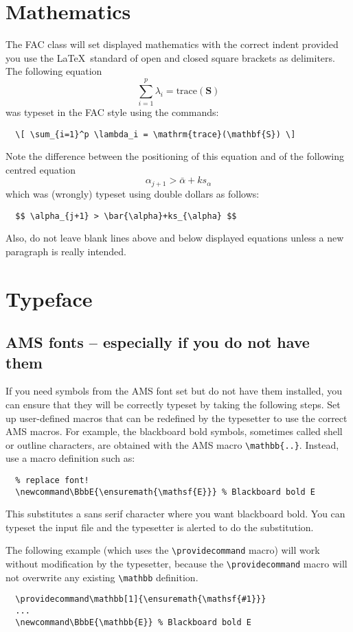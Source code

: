\documentclass{fac}
\begin{document}
\section{Mathematics}

The FAC class will set displayed mathematics with the correct indent
provided you use the \LaTeX\ standard of open and closed square brackets
as delimiters. The following equation
  \[ \sum_{i=1}^p \lambda_i = \mathrm{trace}(\mathbf{S}) \]
was typeset in the FAC style using the commands:
\begin{verbatim}
  \[ \sum_{i=1}^p \lambda_i = \mathrm{trace}(\mathbf{S}) \]
\end{verbatim}
Note the difference between the positioning of this equation and of
the following centred equation
  $$ \alpha_{j+1} > \bar{\alpha}+ks_{\alpha} $$
which was (wrongly) typeset using double dollars as follows:
\begin{verbatim}
  $$ \alpha_{j+1} > \bar{\alpha}+ks_{\alpha} $$
\end{verbatim}
Also, do not leave blank lines above and below displayed equations
unless a new paragraph is really intended.

\section{Typeface}

\subsection{AMS fonts -- especially if you do not have them}

If you need symbols from the AMS font set but do not have them installed,
you can ensure that they will be correctly typeset by taking the following
steps.
Set up user-defined macros that can be redefined by the typesetter to use
the correct AMS macros. For example, the blackboard bold symbols,
sometimes called shell or outline characters, are obtained with the AMS
macro \verb"\mathbb{..}". Instead, use a macro definition such as:
%
\begin{verbatim}
  % replace font!
  \newcommand\BbbE{\ensuremath{\mathsf{E}}} % Blackboard bold E
\end{verbatim}
%
This substitutes a sans serif character where you want blackboard
bold. You can typeset the input file and the typesetter is alerted to do the
substitution.

The following example (which uses the \verb"\providecommand" macro) will work
without modification by the typesetter, because the \verb"\providecommand"
macro will not overwrite any existing \verb"\mathbb" definition.
%
\begin{verbatim}
  \providecommand\mathbb[1]{\ensuremath{\mathsf{#1}}}
  ...
  \newcommand\BbbE{\mathbb{E}} % Blackboard bold E
\end{verbatim}
\end{document}
